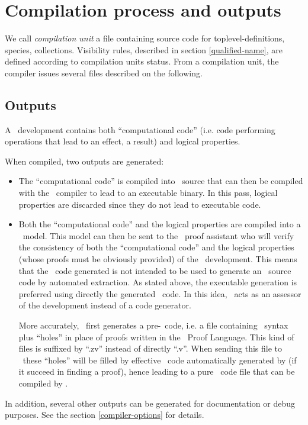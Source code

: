 


\section{Compilation process and outputs}

We call {\em compilation unit} a file
containing source code for toplevel-definitions, species,
collections. Visibility rules, described in section
\ref{qualified-name}, are defined according to compilation units status.
From a compilation unit, the compiler issues several files described
on the following.

\subsection{Outputs}
A \focal\ development contains both
``computational code'' (i.e. code performing operations that lead to
an effect, a result) and logical properties.

\smallskip
When compiled, two outputs are generated:
\begin{itemize}
  \item The ``computational code'' is compiled into \ocaml\ source
    that can then be compiled with the \ocaml\ compiler to lead to an
    executable binary. In this pass, logical properties are discarded
    since they do not lead to executable code.
  \item Both the ``computational code'' and the logical properties are
    compiled into a \coq\ model. This model can then be sent to the
    \coq\ proof assistant who will verify the consistency of both the
    ``computational code'' and the logical properties (whose
    proofs must be obviously provided) of the
    \focal\ development. This means that the \coq\ code generated is
    not intended to be used to generate an \ocaml\ source code by
    automated extraction. As stated above, the executable generation
    is preferred using directly the generated \ocaml\ code. In this
    idea, \coq\ acts as an assessor of the development instead of a
    code generator.

    More accurately, \focal\ first generates a pre-\coq\ code, i.e. a
    file containing \coq\ syntax plus ``holes'' in place of proofs
    written in the \focal\ Proof Language. This kind of files is
    suffixed by ``.zv'' instead of directly ``.v''. When sending this
    file to \zenon\ these ``holes'' will be filled by effective
    \coq\ code automatically generated by \zenon (if it succeed in
    finding a proof), hence leading to a pure \coq\ code file that can
    be compiled by \coq.

\end{itemize}
In addition, several other outputs can be generated for documentation
or debug purposes. See the section \ref{compiler-options} for
details. 


